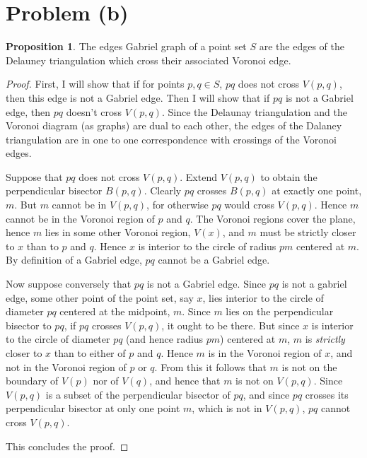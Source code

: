 \documentclass[12pt]{article}
\theoremstyle{definition}
\newtheorem{proposition}{Proposition}
\begin{document}
\section{Problem (b)}

\begin{proposition} The edges Gabriel graph of a point set $S$ are the edges of the Delauney triangulation which cross their associated Voronoi edge. 
\end{proposition}

\begin{proof}

First, I will show that if for points $p,q\in S$, $pq$ does not cross $V(p,q)$, then this edge is not a Gabriel edge. Then I will show that if $pq$ is not a Gabriel edge, then $pq$ doesn't cross $V(p,q)$. Since the Delaunay triangulation and the Voronoi diagram (as graphs) are dual to each other, the edges of the Dalaney triangulation are in one to one correspondence with crossings of the Voronoi edges. 

Suppose that $pq$ does not cross $V(p,q)$. Extend $V(p,q)$ to obtain the perpendicular bisector $B(p,q)$. Clearly $pq$ crosses $ B(p,q) $ at exactly one point, $m$. But $m$ cannot be in $V(p,q)$, for otherwise $pq$ would cross $V(p,q)$. Hence $m$ cannot be in the Voronoi region of $p$ and $q$. The Voronoi regions cover the plane, hence $m$ lies in some other Voronoi region, $V(x)$, and $m$ must be strictly closer to $x$ than to $p$ and $q$. Hence $x$ is interior to the circle of radius $pm$ centered at $m$. By definition of a Gabriel edge, $pq$ cannot be a Gabriel edge.

Now suppose conversely that $ pq $ is not a Gabriel edge. Since $pq$ is not a gabriel edge, some other point of the point set, say $x$, lies interior to the circle of diameter $pq$ centered at the midpoint, $m$. Since $m$ lies on the perpendicular bisector to $pq$, if $pq$ crosses $V(p,q)$, it ought to be there. But since $x$ is interior to the circle of diameter $pq$ (and hence radius $pm$) centered at $m$, $m$ is \textit{strictly} closer to $x$ than to either of $p$ and $q$. Hence $m$ is in the Voronoi region of $x$, and not in the Voronoi region of $p$ or $q$. From this it follows that $m$ is not on the boundary of $V(p)$ nor of $V(q)$, and hence that $m$ is not on $V(p,q)$. Since $V(p,q)$ is a subset of the perpendicular bisector of $pq$, and since $pq$ crosses its perpendicular bisector at only one point $m$, which is not in $V(p,q)$, $pq$ cannot cross $V(p,q)$.

This concludes the proof.


\end{proof}
\end{document}
